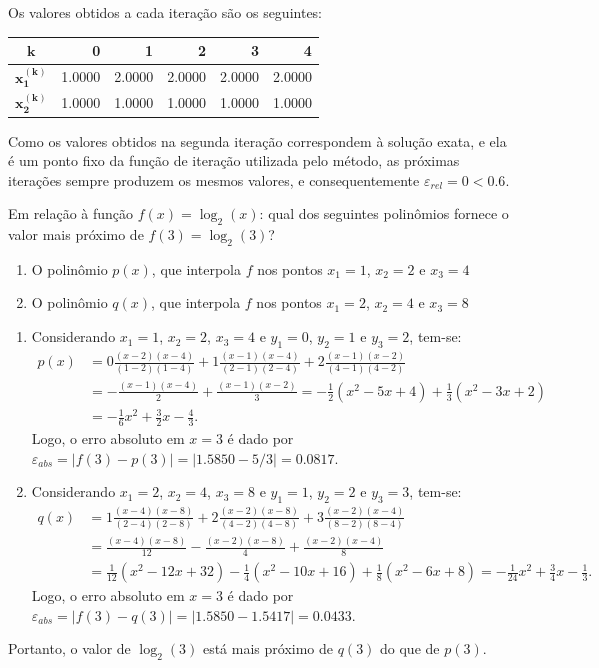 \documentclass[12pt,a4paper]{article}
\begin{document}
\begin{ExerciseList}
Os valores obtidos a cada iteração são os seguintes:
\begin{center}
\begin{tabular}{|c|r|r|r|r|r|}
\hline
$\mathbf{k}$     & 0 & 1 & 2 & 3 & 4 \\
\hline
$\mathbf{x_1^{(k)}}$ & 1.0000 & 2.0000 & 2.0000 & 2.0000 & 2.0000 \\
\hline
$\mathbf{x_2^{(k)}}$ & 1.0000 & 1.0000 & 1.0000 & 1.0000 & 1.0000 \\
\hline
\end{tabular}
\end{center}
\medskip
Como os valores obtidos na segunda iteração correspondem à solução exata, e ela é um ponto fixo da função de iteração utilizada pelo método, as próximas iterações sempre produzem os mesmos valores, e consequentemente $\varepsilon_{rel} = 0 < 0.6$.

\Exercise[title={2,5}] Em relação à função $f(x) = \log_2(x)$: qual dos seguintes polinômios fornece o valor mais próximo de $f(3) = \log_2(3)$?
\begin{enumerate}
\item O polinômio $p(x)$, que interpola $f$ nos pontos $x_1 = 1$,  $x_2 = 2$ e  $x_3 = 4$
\item O polinômio $q(x)$, que interpola $f$ nos pontos $x_1 = 2$,  $x_2 = 4$ e  $x_3 = 8$
\end{enumerate}
\Answer
\begin{enumerate}
\item Considerando $x_1 = 1$,  $x_2 = 2$, $x_3 = 4$ e $y_1 = 0$, $y_2 = 1$ e  $y_3 = 2$, tem-se:
\begin{align*}
p(x)
& = 0 \frac{(x-2)(x-4)}{(1-2)(1-4)}
  + 1 \frac{(x-1)(x-4)}{(2-1)(2-4)}
  + 2 \frac{(x-1)(x-2)}{(4-1)(4-2)}\\
& = - \frac{(x - 1)(x - 4)}{2}
    + \frac{(x - 1)(x - 2)}{3}
  = -\frac{1}{2}\left( x^2 - 5x + 4 \right)
  +  \frac{1}{3}\left( x^2 - 3x + 2 \right)\\
& = -\frac{1}{6}x^2 + \frac{3}{2}x - \frac{4}{3}.
\end{align*}
Logo, o erro absoluto em $x = 3$ é dado por
$
\varepsilon_{abs} = |f(3) - p(3)| = |1.5850 - 5/3| = 0.0817
$.
\item Considerando $x_1 = 2$,  $x_2 = 4$, $x_3 = 8$ e $y_1 = 1$, $y_2 = 2$ e  $y_3 = 3$, tem-se:
\begin{align*}
q(x)
& = 1 \frac{(x-4)(x-8)}{(2-4)(2-8)}
  + 2 \frac{(x-2)(x-8)}{(4-2)(4-8)}
  + 3 \frac{(x-2)(x-4)}{(8-2)(8-4)}\\
& = \frac{(x - 4)(x - 8)}{12}
  - \frac{(x - 2)(x - 8) }{4}
  + \frac{(x - 2)(x - 4)}{8}\\
& = \frac{1}{12}\left( x^2 - 12x + 32 \right)
  - \frac{1}{4} \left( x^2 - 10x + 16 \right)
  + \frac{1}{8} \left( x^2 -  6x +  8 \right)
  = -\frac{1}{24}x^2 + \frac{3}{4}x - \frac{1}{3}.
\end{align*}
Logo, o erro absoluto em $x = 3$ é dado por
$
\varepsilon_{abs} = |f(3) - q(3)| = |1.5850 - 1.5417| = 0.0433
$.
\end{enumerate}
Portanto, o valor de $\log_2(3)$ está mais próximo de $q(3)$ do que de $p(3)$.


\end{ExerciseList}
\end{document}
